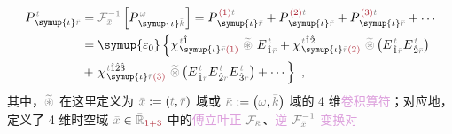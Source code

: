 \begin{subequations}
	\abovedisplayskip=10pt
	\belowdisplayskip=12pt
\begin{align}
	P^{\;\!\mathcolor{gray}{t}}_{\;\! \symup{\iota}\mathcolor{gray}{\bar{r}}} &= \mathcolor{gray}{\mathcal F_{\bar{x}}^{-1}} \left[ P^{\;\! \mathcolor{gray}{\omega}}_{\;\! \symup{\iota}\mathcolor{gray}{\bar{k}}} \right] = P^{\;\! \textcolor{Maroon}{(1)} \mathcolor{gray}{t}}_{\;\! \symup{\iota}\mathcolor{gray}{\bar{r}}} + P^{\;\! \textcolor{Maroon}{(2)} \mathcolor{gray}{t}}_{\;\! \symup{\iota}\mathcolor{gray}{\bar{r}}} + P^{\;\! \textcolor{Maroon}{(3)} \mathcolor{gray}{t}}_{\;\! \symup{\iota}\mathcolor{gray}{\bar{r}}} + \cdots \\ &= {\symup{\varepsilon_0}} \left\{ \chi^{\;\! \mathcolor{gray}{t} \hat{1}}_{\;\! \symup{\iota} \mathcolor{gray}{\bar{r}} \textcolor{Maroon}{(1)}} ~\mathcolor{gray}{\widetilde \circledast}~ E^{\;\!\mathcolor{gray}{t}}_{\;\! \hat{1} \mathcolor{gray}{\bar{r}}} + \chi^{\;\! \mathcolor{gray}{t} \hat{1} \hat{2}}_{\;\! \symup{\iota} \mathcolor{gray}{\bar{r}} \textcolor{Maroon}{(2)}}~\mathcolor{gray}{\widetilde \circledast}\left( E^{\;\!\mathcolor{gray}{t}}_{\;\! \hat{1} \mathcolor{gray}{\bar{r}}} E^{\;\!\mathcolor{gray}{t}}_{\;\! \hat{2} \mathcolor{gray}{\bar{r}}} \right) \right. \label{eq:P_tr} \\ &+ \left. \chi^{\;\! \mathcolor{gray}{t} \hat{1} \hat{2} \hat{3}}_{\;\! \symup{\iota} \mathcolor{gray}{\bar{r}} \textcolor{Maroon}{(3)}}~\mathcolor{gray}{\widetilde \circledast}\left( E^{\;\!\mathcolor{gray}{t}}_{\;\! \hat{1} \mathcolor{gray}{\bar{r}}} E^{\;\!\mathcolor{gray}{t}}_{\;\! \hat{2} \mathcolor{gray}{\bar{r}}} E^{\;\!\mathcolor{gray}{t}}_{\;\! \hat{3} \mathcolor{gray}{\bar{r}}} \right) + \cdots \right\}~,
\end{align}
\end{subequations}
其中，$\mathcolor{gray}{\widetilde \circledast}$ 在这里定义为 $\mathcolor{gray}{\bar{x}} := \left( \mathcolor{gray}{t}, \mathcolor{gray}{\bar{r}} \right)$ 域或 $\mathcolor{gray}{\bar{\kappa}} := \left( \mathcolor{gray}{\omega}, \mathcolor{gray}{\bar{k}} \right)$ 域的 4 维\textcolor{Plum}{卷积算符}；对应地，定义了 4 维时空域 $\mathcolor{gray}{\bar{x}} \in \mathcolor{gray}{\bar{\mathbb{R}}_{\textcolor{Maroon}{1+3}}}$ 中的\textcolor{Plum}{傅立叶正} $\mathcolor{gray}{\mathcal F_{\bar{\kappa}}}$、\textcolor{Plum}{逆} $\mathcolor{gray}{\mathcal F_{\bar{x}}^{-1}}$ \textcolor{Plum}{变换对}
